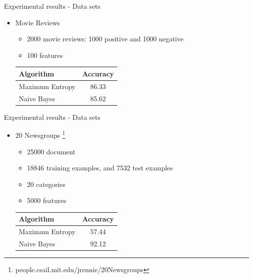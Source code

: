 \documentclass{beamer}
\begin{document}
\begin{frame}{Experimental results - Data sets}

\begin{itemize}
\item Movie Reviews\citep{Pang+Lee:04a}

\begin{itemize}
\item 2000 movie reviews: 1000 positive and 1000 negative
\item 100 features
\end{itemize}

\begin{table}[ht]
\centering
\begin{tabular}{ l c }
    \hline\hline
    Algorithm & Accuracy \\ [0.2ex]
    \hline
    Maximum Entropy &  86.33 \\ %
    Naive Bayes & 85.62 \\ %
    \hline
  \end{tabular}
\label{table:mrprecision}
\end{table}

\end{itemize}

\end{frame}


\begin{frame}{Experimental results - Data sets}

\begin{itemize}
\item 20 Newsgroups \footnote{people.csail.mit.edu/jrennie/20Newsgroups}

\begin{itemize}
\item 25000 document
\item 18846 training examples, and 7532 test examples
\item 20 categories
\item 5000 features
\end{itemize}

\begin{table}[ht]
\centering
\begin{tabular}{ l c }
    \hline\hline
    Algorithm & Accuracy \\ [0.2ex]
    \hline
    Maximum Entropy &  57.44 \\
    Naive Bayes & 92.12  \\
    \hline
  \end{tabular}
\label{table:20nprecision}
\end{table}

\end{itemize}

\end{frame}
\end{document}
